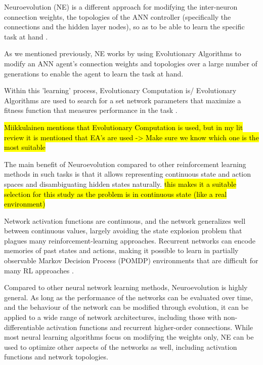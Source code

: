 Neuroevolution (NE) is a different approach for modifying the inter-neuron connection weights, the topologies of the ANN controller (specifically the connections and the hidden layer nodes), so as to be able to learn the specific task at hand \cite{Miikkulainen2010}.

As we mentioned previously, NE works by using Evolutionary Algorithms to modify an ANN agent's connection weights and topologies over a large number of generations to enable the agent to learn the task at hand.


Within this 'learning' process, Evolutionary Computation is/ Evolutionary Algorithms are used to search for a set network parameters that maximize a fitness function that measures performance in the task \cite{Miikkulainen2010}.


\hl{Miikkulainen mentions that Evolutionary Computation is used, but in my lit review it is mentioned that EA's are used -> Make sure we know which one is the most suitable}





The main benefit of Neuroevolution compared to other reinforcement learning methods in such tasks is that it allows representing continuous state and action spaces and disambiguating hidden states naturally. \hl{this makes it a suitable selection for this study as the problem is in continuous state (like a real environment)}

Network activation functions are continuous, and the network generalizes well between continuous values, largely avoiding the state explosion problem that plagues many reinforcement-learning approaches. Recurrent networks can encode memories of past states and actions, making it possible to learn in partially observable Markov Decision Process (POMDP) environments that are difficult for many RL approaches \cite{Miikkulainen2010}.

Compared to other neural network learning methods, Neuroevolution is highly general. As long as the performance of the networks can be evaluated over time, and the behaviour of the network can be modified through evolution, it can be applied to a wide range of network architectures, including those with non-differentiable activation functions and recurrent  higher-order connections. While most neural learning algorithms focus on modifying the weights only, NE can be used to optimize other aspects of the networks as well, including activation functions and network topologies.

